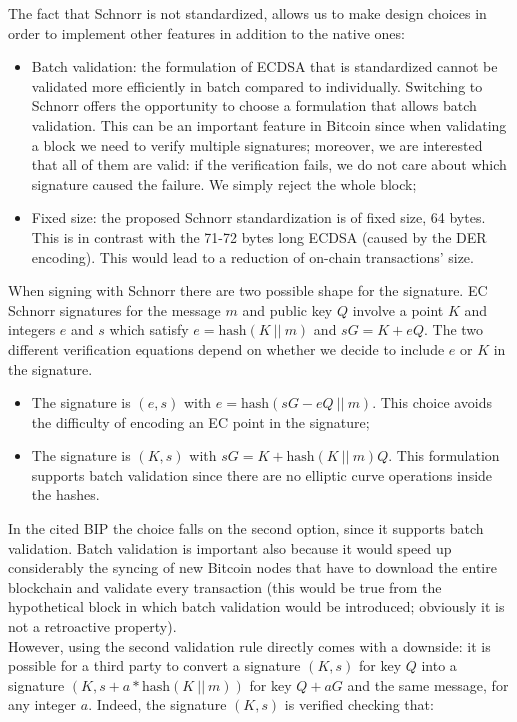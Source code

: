 \bigskip
\noindent
The fact that Schnorr is not standardized, allows us to make design choices in order to implement other features in addition to the native ones:
\begin{itemize}
	\item Batch validation: the formulation of ECDSA that is standardized cannot be validated more efficiently in batch compared to individually. Switching to Schnorr offers the opportunity to choose a formulation that allows batch validation. This can be an important feature in Bitcoin since when validating a block we need to verify multiple signatures; moreover, we are interested that all of them are valid: if the verification fails, we do not care about which signature caused the failure. We simply reject the whole block;
	\item Fixed size: the proposed Schnorr standardization is of fixed size, 64 bytes. This is in contrast with the 71-72 bytes long ECDSA (caused by the DER encoding). This would lead to a reduction of on-chain transactions' size.
\end{itemize}
When signing with Schnorr there are two possible shape for the signature. EC Schnorr signatures for the message $m$ and public key $Q$ involve a point $K$ and integers $e$ and $s$ which satisfy $e = \text{hash}(K \ || \ m)$ and $sG = K + eQ$. The two different verification equations depend on whether we decide to include $e$ or $K$ in the signature.
\begin{itemize}
	\item The signature is $(e, s)$ with $e = \text{hash}(sG - eQ \ || \ m)$. This choice avoids the difficulty of encoding an EC point in the signature;
	\item The signature is $(K, s)$ with $sG = K + \text{hash}(K \ || \ m)Q$. This formulation supports batch validation since there are no elliptic curve operations inside the hashes.
\end{itemize}
In the cited BIP the choice falls on the second option, since it supports batch validation. Batch validation is important also because it would speed up considerably the syncing of new Bitcoin nodes that have to download the entire blockchain and validate every transaction (this would be true from the hypothetical block in which batch validation would be introduced; obviously it is not a retroactive property).
\\
However, using the second validation rule directly comes with a downside: it is possible for a third party to convert a signature $(K, s)$ for key $Q$ into a signature $(K, s + a*\text{hash}(K \ || \ m))$ for key $Q + aG$ and the same message, for any integer $a$. Indeed, the signature $(K, s)$ is verified checking that: 
